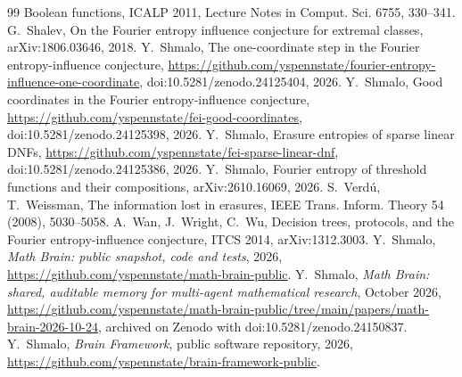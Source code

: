 \documentclass[11pt]{amsart}
\theoremstyle{remark}
\begin{document}
\begin{thebibliography}{99}
Boolean functions, ICALP 2011, Lecture Notes in Comput. Sci. 6755, 330--341.
 G.~Shalev, On the Fourier entropy influence conjecture for extremal classes, arXiv:1806.03646, 2018.
 Y.~Shmalo, The one-coordinate step in the Fourier entropy-influence conjecture,
\url{https://github.com/yspennstate/fourier-entropy-influence-one-coordinate}, doi:10.5281/zenodo.24125404, 2026.
 Y.~Shmalo, Good coordinates in the Fourier entropy-influence conjecture,
\url{https://github.com/yspennstate/fei-good-coordinates}, doi:10.5281/zenodo.24125398, 2026.
 Y.~Shmalo, Erasure entropies of sparse linear DNFs,
\url{https://github.com/yspennstate/fei-sparse-linear-dnf}, doi:10.5281/zenodo.24125386, 2026.
 Y.~Shmalo, Fourier entropy of threshold functions and their compositions,
arXiv:2610.16069, 2026.
 S.~Verd\'u, T.~Weissman, The information lost in erasures, IEEE Trans. Inform. Theory 54 (2008),
5030--5058.
 A.~Wan, J.~Wright, C.~Wu, Decision trees, protocols, and the Fourier entropy-influence conjecture, ITCS 2014,
arXiv:1312.3003.
 Y.~Shmalo, \emph{Math Brain: public snapshot, code and tests}, 2026,
\url{https://github.com/yspennstate/math-brain-public}.
 Y.~Shmalo, \emph{Math Brain: shared, auditable memory for multi-agent mathematical research},
October 2026, \url{https://github.com/yspennstate/math-brain-public/tree/main/papers/math-brain-2026-10-24}, archived on Zenodo with doi:10.5281/zenodo.24150837.
 Y.~Shmalo, \emph{Brain Framework}, public software repository, 2026,
\url{https://github.com/yspennstate/brain-framework-public}.
\end{thebibliography}
\end{document}
